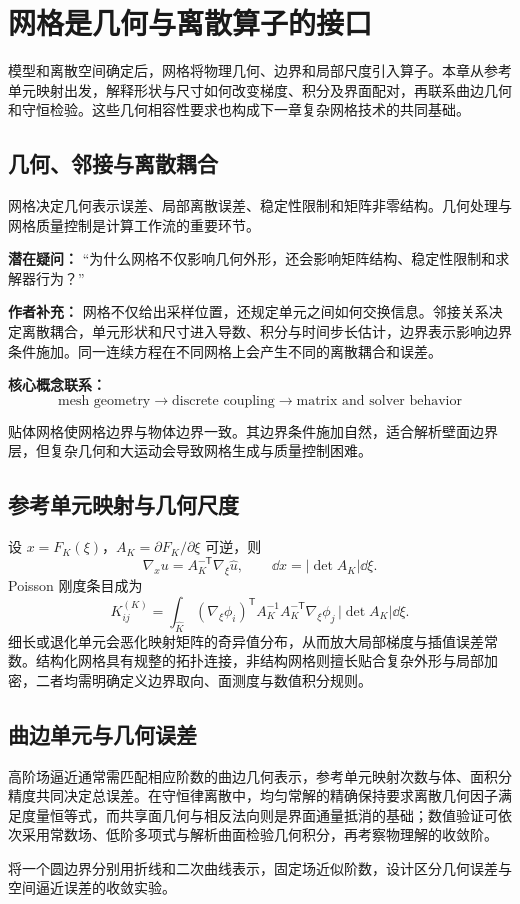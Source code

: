 \chapter{网格是几何与离散算子的接口}\label{ch:20}
\begin{chaptersummary}
模型和离散空间确定后，网格将物理几何、边界和局部尺度引入算子。本章从参考单元映射出发，解释形状与尺寸如何改变梯度、积分及界面配对，再联系曲边几何和守恒检验。这些几何相容性要求也构成下一章复杂网格技术的共同基础。
\end{chaptersummary}
\section{几何、邻接与离散耦合}
网格决定几何表示误差、局部离散误差、稳定性限制和矩阵非零结构。几何处理与网格质量控制是计算工作流的重要环节。

\begin{authornote}
\textbf{潜在疑问：}
“为什么网格不仅影响几何外形，还会影响矩阵结构、稳定性限制和求解器行为？”

\textbf{作者补充：}
网格不仅给出采样位置，还规定单元之间如何交换信息。邻接关系决定离散耦合，单元形状和尺寸进入导数、积分与时间步长估计，边界表示影响边界条件施加。同一连续方程在不同网格上会产生不同的离散耦合和误差。

\textbf{核心概念联系：}
\[
\text{mesh geometry}
\longrightarrow
\text{discrete coupling}
\longrightarrow
\text{matrix and solver behavior}
\]
\end{authornote}

贴体网格使网格边界与物体边界一致。其边界条件施加自然，适合解析壁面边界层，但复杂几何和大运动会导致网格生成与质量控制困难。

\section{参考单元映射与几何尺度}
设 $x=F_K(\xi)$，$A_K=\partial F_K/\partial\xi$ 可逆，则
\[
\nabla_xu=A_K^{-\mathsf T}\nabla_\xi\widehat u,\qquad
\dd x=|\det A_K|\dd\xi.
\]
Poisson 刚度条目成为
\[
K_{ij}^{(K)}
=\int_{\widehat K}(\nabla_\xi\phi_i)^{\mathsf T}
A_K^{-1}A_K^{-\mathsf T}\nabla_\xi\phi_j\,|\det A_K|\dd\xi.
\]
细长或退化单元会恶化映射矩阵的奇异值分布，从而放大局部梯度与插值误差常数。结构化网格具有规整的拓扑连接，非结构网格则擅长贴合复杂外形与局部加密，二者均需明确定义边界取向、面测度与数值积分规则。

\section{曲边单元与几何误差}
高阶场逼近通常需匹配相应阶数的曲边几何表示，参考单元映射次数与体、面积分精度共同决定总误差。在守恒律离散中，均匀常解的精确保持要求离散几何因子满足度量恒等式，而共享面几何与相反法向则是界面通量抵消的基础；数值验证可依次采用常数场、低阶多项式与解析曲面检验几何积分，再考察物理解的收敛阶。

{将一个圆边界分别用折线和二次曲线表示，固定场近似阶数，设计区分几何误差与空间逼近误差的收敛实验。}

